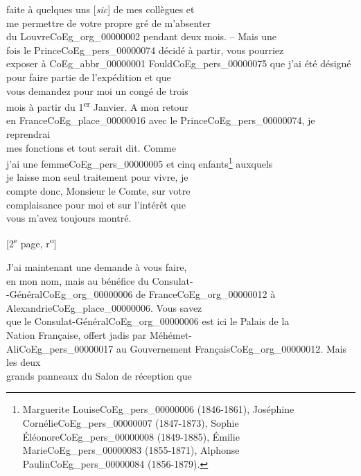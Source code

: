 \documentclass{book}
\begin{document}
faite à quelques uns {[\textit{sic}]} de mes collègues et\\
me permettre de votre propre gré de m’absenter\\
du Louvre\gls{CoEg_org_00000002} pendant deux mois. – Mais une\\
fois le Prince\gls{CoEg_pers_00000074} décidé à partir, vous pourriez\\
exposer à \gls{CoEg_abbr_00000001} Fould\gls{CoEg_pers_00000075} que j’ai été désigné\\
pour faire partie de l’expédition et que\\
vous demandez pour moi un congé de trois\\
mois à partir du 1\textsuperscript{er} Janvier. A mon retour\\
en France\gls{CoEg_place_00000016} avec le Prince\gls{CoEg_pers_00000074}, je reprendrai\\
mes fonctions et tout serait dit. Comme\\
j’ai une femme\gls{CoEg_pers_00000005} et cinq enfants\footnote{Marguerite Louise\gls{CoEg_pers_00000006} (1846-1861), Joséphine Cornélie\gls{CoEg_pers_00000007} (1847-1873), Sophie Éléonore\gls{CoEg_pers_00000008} (1849-1885), Émilie Marie\gls{CoEg_pers_00000083} (1855-1871), Alphonse Paulin\gls{CoEg_pers_00000084} (1856-1879).} auxquels\\
je laisse mon seul traitement pour vivre, je\\
compte donc, Monsieur le Comte, sur votre\\
complaisance pour moi et sur l’intérêt que\\
vous m’avez toujours montré.
{\footnotesize\begin{center} {[2\textsuperscript{e} page, r\textsuperscript{o}]}\end{center}}
\indent J’ai maintenant une demande à vous faire,\\
en mon nom, mais au bénéfice du Consulat-\\
-Général\gls{CoEg_org_00000006} de France\gls{CoEg_org_00000012} à Alexandrie\gls{CoEg_place_00000006}. Vous savez\\
que le Consulat-Général\gls{CoEg_org_00000006} est ici le Palais de la\\
Nation Française, offert jadis par Méhémet-\\
Ali\gls{CoEg_pers_00000017} au Gouvernement Français\gls{CoEg_org_00000012}. Mais les deux\\
grands panneaux du Salon de réception que\\
\end{document}
